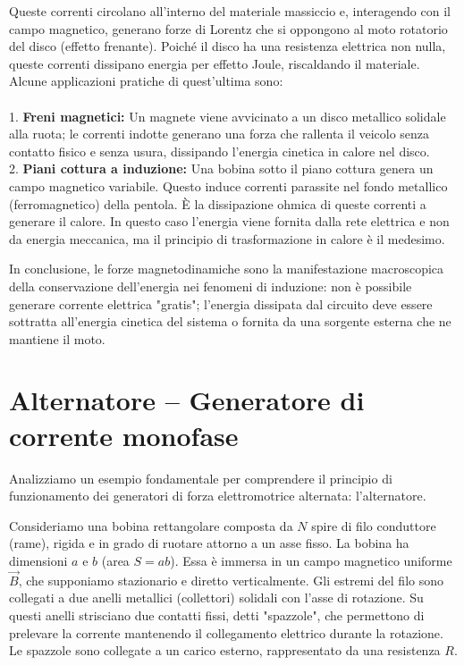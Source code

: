 \documentclass{book}
\begin{document}
\begin{itemize}
Queste correnti circolano all'interno del materiale massiccio e, interagendo con il campo magnetico, generano forze di Lorentz che si oppongono al moto rotatorio del disco (effetto frenante).
Poiché il disco ha una resistenza elettrica non nulla, queste correnti dissipano energia per effetto Joule, riscaldando il materiale.
Alcune applicazioni pratiche di quest'ultima sono:\\
\\
1. \textbf{Freni magnetici:} Un magnete viene avvicinato a un disco metallico solidale alla ruota; le correnti indotte generano una forza che rallenta il veicolo senza contatto fisico e senza usura, dissipando l'energia cinetica in calore nel disco.\\
2. \textbf{Piani cottura a induzione:} Una bobina sotto il piano cottura genera un campo magnetico variabile. Questo induce correnti parassite nel fondo metallico (ferromagnetico) della pentola. È la dissipazione ohmica di queste correnti a generare il calore. In questo caso l'energia viene fornita dalla rete elettrica e non da energia meccanica, ma il principio di trasformazione in calore è il medesimo.

In conclusione, le forze magnetodinamiche sono la manifestazione macroscopica della conservazione dell'energia nei fenomeni di induzione: non è possibile generare corrente elettrica "gratis"; l'energia dissipata dal circuito deve essere sottratta all'energia cinetica del sistema o fornita da una sorgente esterna che ne mantiene il moto.

\end{itemize}



\section{Alternatore -- Generatore di corrente monofase}
Analizziamo un esempio fondamentale per comprendere il principio di funzionamento dei generatori di forza elettromotrice alternata: l'alternatore.

Consideriamo una bobina rettangolare composta da $N$ spire di filo conduttore (rame), rigida e in grado di ruotare attorno a un asse fisso. La bobina ha dimensioni $a$ e $b$ (area $S=ab$). Essa è immersa in un campo magnetico uniforme $\vec{B}$, che supponiamo stazionario e diretto verticalmente.
Gli estremi del filo sono collegati a due anelli metallici (collettori) solidali con l'asse di rotazione. Su questi anelli strisciano due contatti fissi, detti "spazzole", che permettono di prelevare la corrente mantenendo il collegamento elettrico durante la rotazione. Le spazzole sono collegate a un carico esterno, rappresentato da una resistenza $R$.
\end{document}
